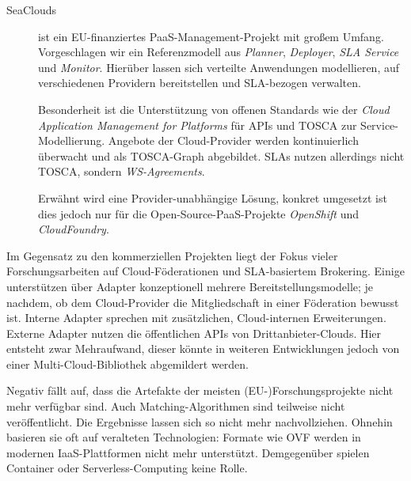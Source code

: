 \begin{description}
	
	\item[SeaClouds] ist ein EU-finanziertes PaaS-Management-Projekt mit großem Umfang. Vorgeschlagen wir ein Referenzmodell aus \emph{Planner}, \emph{Deployer}, \emph{SLA Service} und \emph{Monitor}. Hierüber lassen sich verteilte Anwendungen modellieren, auf verschiedenen Providern bereitstellen und SLA-bezogen verwalten.
	
	Besonderheit ist die Unterstützung von offenen Standards wie der \emph{Cloud Application Management for Platforms} für APIs und TOSCA zur Service-Modellierung. Angebote der Cloud-Provider werden kontinuierlich überwacht und als TOSCA-Graph abgebildet. SLAs nutzen allerdings nicht TOSCA, sondern \emph{WS-Agreements}.
		
	Erwähnt wird eine Provider-unabhängige Lösung, konkret umgesetzt ist dies jedoch nur für die Open-Source-PaaS-Projekte \emph{OpenShift} und \emph{CloudFoundry}.
	
	
%	
%	
%	
	
\end{description}



\noindent
Im Gegensatz zu den kommerziellen Projekten liegt der Fokus vieler Forschungsarbeiten auf Cloud-Föderationen und SLA-basiertem Brokering. Einige unterstützen über Adapter konzeptionell mehrere Bereitstellungsmodelle; je nachdem, ob dem Cloud-Provider die Mitgliedschaft in einer Föderation bewusst ist. Interne Adapter sprechen mit zusätzlichen, Cloud-internen Erweiterungen. Externe Adapter nutzen die öffentlichen APIs von Drittanbieter-Clouds. Hier entsteht zwar Mehraufwand, dieser könnte in weiteren Entwicklungen jedoch von einer Multi-Cloud-Bibliothek abgemildert werden.

Negativ fällt auf, dass die Artefakte der meisten (EU-)Forschungsprojekte
nicht mehr verfügbar sind. Auch Matching-Algorithmen sind teilweise nicht veröffentlicht. Die Ergebnisse lassen sich so nicht mehr nachvollziehen. Ohnehin basieren sie oft auf veralteten Technologien: Formate wie OVF werden in modernen IaaS-Plattformen nicht mehr unterstützt. Demgegenüber spielen Container oder Serverless-Computing keine Rolle.

